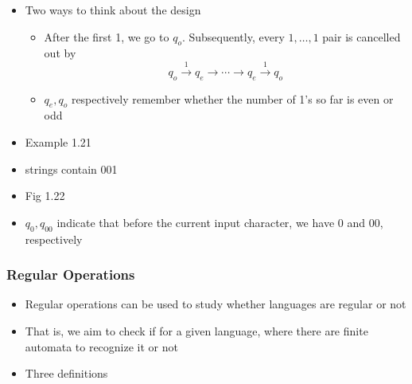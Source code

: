 \begin{frame}[allowframebreaks]
\begin{itemize}
\item Two ways to think about the design
  \begin{itemize}
  \item After the first 1, we go to $q_o$. Subsequently, every $1, \ldots, 1$ pair is cancelled out by
  \begin{equation*}
q_o \xrightarrow{1} q_e \rightarrow \cdots \rightarrow q_e
    \xrightarrow{1} q_o
  \end{equation*}
\item $q_e, q_o$ respectively remember whether the number of 1's
  so far is even or odd
  \end{itemize}
\item Example 1.21
  
\item [] strings contain 001

\item [] Fig 1.22

\begin{center}
    \end{center}
  \item $q_0, q_{00}$ indicate that before the current input character,
    we have 0 and 00, respectively
\end{itemize}\end{frame} \begin{frame}[allowframebreaks] \frametitle{Regular Operations}
  \begin{itemize}
\item Regular operations can be used to study whether languages are regular or not

\item  That is, we aim to check if for a given language,
  where there are finite automata to recognize it or not
\item Three definitions


\end{itemize}
\end{frame}
